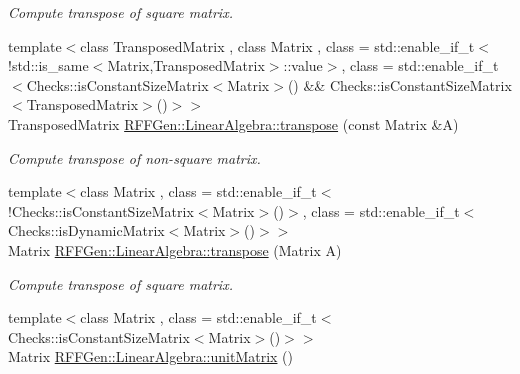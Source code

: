 \begin{DoxyCompactItemize}
\begin{DoxyCompactList}\small\item\em Compute transpose of square matrix. \end{DoxyCompactList}\item 
\hypertarget{group__LinearAlgebraGroup_ga0d90e6ad4304aa185d8dd54c109b1a0c}{{\footnotesize template$<$class Transposed\-Matrix , class Matrix , class  = std\-::enable\-\_\-if\-\_\-t$<$!std\-::is\-\_\-same$<$\-Matrix,\-Transposed\-Matrix$>$\-::value$>$, class  = std\-::enable\-\_\-if\-\_\-t$<$\-Checks\-::is\-Constant\-Size\-Matrix$<$\-Matrix$>$() \&\& Checks\-::is\-Constant\-Size\-Matrix$<$\-Transposed\-Matrix$>$()$>$$>$ }\\Transposed\-Matrix \hyperlink{group__LinearAlgebraGroup_ga0d90e6ad4304aa185d8dd54c109b1a0c}{R\-F\-F\-Gen\-::\-Linear\-Algebra\-::transpose} (const Matrix \&A)}\label{group__LinearAlgebraGroup_ga0d90e6ad4304aa185d8dd54c109b1a0c}

\begin{DoxyCompactList}\small\item\em Compute transpose of non-\/square matrix. \end{DoxyCompactList}\item 
\hypertarget{group__LinearAlgebraGroup_ga21731f4340490258f50b39535b20ffac}{{\footnotesize template$<$class Matrix , class  = std\-::enable\-\_\-if\-\_\-t$<$!\-Checks\-::is\-Constant\-Size\-Matrix$<$\-Matrix$>$()$>$, class  = std\-::enable\-\_\-if\-\_\-t$<$\-Checks\-::is\-Dynamic\-Matrix$<$\-Matrix$>$()$>$$>$ }\\Matrix \hyperlink{group__LinearAlgebraGroup_ga21731f4340490258f50b39535b20ffac}{R\-F\-F\-Gen\-::\-Linear\-Algebra\-::transpose} (Matrix A)}\label{group__LinearAlgebraGroup_ga21731f4340490258f50b39535b20ffac}

\begin{DoxyCompactList}\small\item\em Compute transpose of square matrix. \end{DoxyCompactList}\item 
\hypertarget{group__LinearAlgebraGroup_ga26f268e59fd94b2215cedc74d834871e}{{\footnotesize template$<$class Matrix , class  = std\-::enable\-\_\-if\-\_\-t$<$\-Checks\-::is\-Constant\-Size\-Matrix$<$\-Matrix$>$()$>$$>$ }\\Matrix \hyperlink{group__LinearAlgebraGroup_ga26f268e59fd94b2215cedc74d834871e}{R\-F\-F\-Gen\-::\-Linear\-Algebra\-::unit\-Matrix} ()}\label{group__LinearAlgebraGroup_ga26f268e59fd94b2215cedc74d834871e}


\end{DoxyCompactItemize}

